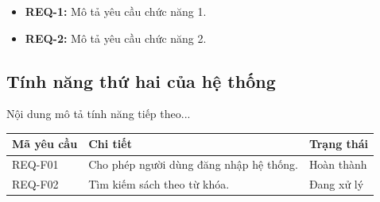 \begin{itemize}
    \item \textbf{REQ-1:} Mô tả yêu cầu chức năng 1.
    \item \textbf{REQ-2:} Mô tả yêu cầu chức năng 2.
\end{itemize}

\vspace{0.5cm}

\subsection{Tính năng thứ hai của hệ thống}

Nội dung mô tả tính năng tiếp theo...

\vspace{0.3cm}

\noindent
\begin{tabularx}{\textwidth}{|p{3.0cm}|X|p{2.5cm}|}
    \hline
    \rowcolor{gray!25}
    \textbf{Mã yêu cầu} & \textbf{Chi tiết} & \textbf{Trạng thái} \\ \hline
    REQ-F01 & Cho phép người dùng đăng nhập hệ thống. & Hoàn thành \\ \hline
    REQ-F02 & Tìm kiếm sách theo từ khóa. & Đang xử lý \\ \hline
\end{tabularx}
